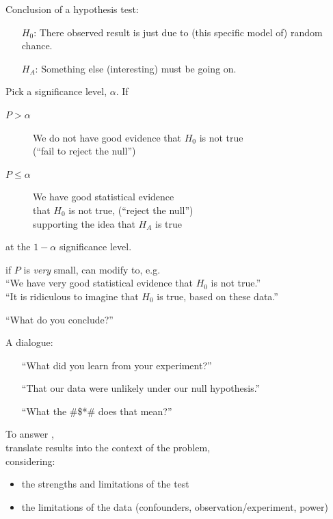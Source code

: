 \begin{frame}{Conclusion of a hypothesis test:}
    \begin{itemize}
        \item[$H_0$:] There observed result is just due to (this specific model of) random chance.
        \item[$H_A$:] Something else (interesting) must be going on.
    \end{itemize}
    \pause
    \vfill

    Pick a \alert{significance level}, $\alpha$.  If
    \begin{description}
        \item[$P > \alpha$] We do not have good evidence that $H_0$ is not true\\
            (``fail to reject the null'')
        \item[$P \le \alpha$] We have good statistical evidence \\
            that $H_0$ is not true,
            (``reject the null'')\\
            supporting the idea that $H_A$ is true
    \end{description}
    at the $1-\alpha$ significance level.
    \pause
    \vfill

     if $P$ is \emph{very} small,
    can modify to, e.g.\\
    ``We have very good statistical evidence that $H_0$ is not true.''\\
    \pause
    ``It is ridiculous to imagine that $H_0$ is true, based on these data.''

\end{frame}

\begin{frame}{``What do you conclude?''}

    A dialogue:
    \begin{itemize}
        \item[] ``What did you learn from your experiment?''
            \pause
        \item[] ``That our data were unlikely under our null hypothesis.''
            \pause
        \item[] ``What the \@\#\$*\@\# does that mean?''
    \end{itemize}
    \pause
    \vspace{2em}

    To answer ,\\
    \alert{translate} results into the context of the problem,\\
    considering:
    \begin{itemize}
        \item the strengths and limitations of the test
        \item the limitations of the data (confounders, observation/experiment, power)
    \end{itemize}


\end{frame}


